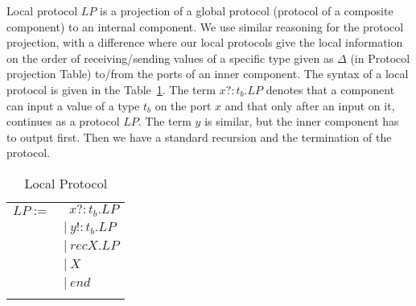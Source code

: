   Local protocol $LP$ is a projection of a global protocol (protocol of a composite component) to an internal component. We use similar reasoning for the protocol projection, with a difference where our local protocols give the local information on the order of receiving/sending values of a specific type given as $\Delta$ (in Protocol projection Table) to/from the ports of an inner component. The syntax of a local protocol is given in the Table~\ref{tab:localprotocol}. The term $x?:t_b.LP$ denotes that a component can input a value of a type $t_b$ on the port $x$ and that only after an input on it, continues as a protocol $LP$. The term $y$ is similar, but the inner component has to output first. Then we have a standard recursion and the termination of the protocol.
  
  
  
  
  
  \vspace{0.5cm}
  \begin{table}[H]
  \begin{center}
  \begin{tabular}{r l}
      $LP:=$  & $\ \  x?:t_b.LP$ \\
       & $|\ y!:t_b.LP$\\
       & $|\ recX.LP$\\
       & $|\ X$ \\
       & $|\ end$\\
       & \\
       
  \end{tabular}
    \end{center}
\caption {Local Protocol} \label{tab:localprotocol}
\end{table}



